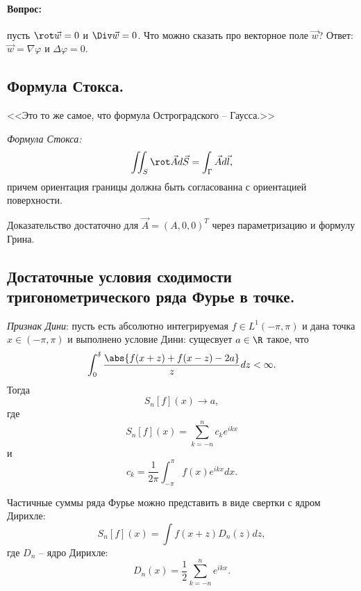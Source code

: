 \paragraph*{Вопрос:} пусть $\rot \vec{w} = 0$ и $\Div \vec{w} = 0$. Что можно сказать про векторное поле $\vec{w}$? Ответ: $\vec{w} = \nabla \varphi$ и $\Delta \varphi = 0$.

\subsection{Формула Стокса.}
<<Это то же самое, что формула Остроградского -- Гаусса.>> \textcopyright

\textit{Формула Стокса:}
\begin{equation*}
    \iint_S \rot \vec{A}d\vec{S} = \int_{\Gamma} \vec{A} d\vec{l},
\end{equation*}
причем ориентация границы должна быть согласованна с ориентацией поверхности.

Доказательство достаточно для $\vec{A} = (A, 0, 0)^T$ через параметризацию и формулу Грина.

\subsection{Достаточные условия сходимости тригонометрического ряда Фурье в точке.}

\textit{Признак Дини}: пусть есть абсолютно интегрируемая $f \in L^1(-\pi, \pi)$ и дана точка $x \in (-\pi, \pi)$ и выполнено условие Дини: сущесвует $a \in \R$ такое, что
\begin{equation*}
    \int_0^{\delta} \frac{\abs{f(x + z) + f(x - z) - 2a}}{z} dz < \infty.
\end{equation*}
Тогда 
\begin{equation*}
    S_n[f](x) \to a,
\end{equation*}
где
\begin{equation*}
    S_n[f](x) = \sum_{k = -n}^n c_k e^{ikx}
\end{equation*}
и
\begin{equation*}
    c_k = \frac{1}{2\pi}\int_{-\pi}^{\pi} f(x) e^{ikx} dx.
\end{equation*}

Частичные суммы ряда Фурье можно представить в виде свертки с ядром Дирихле:
\begin{equation*}
    S_n[f] (x) = \int f(x + z) D_n(z) dz,
\end{equation*}
где $D_n$ -- ядро Дирихле:
\begin{equation*}
    D_n(x) = \frac{1}{2}\sum_{k = -n}^{n} e^{ikx}.
\end{equation*}

